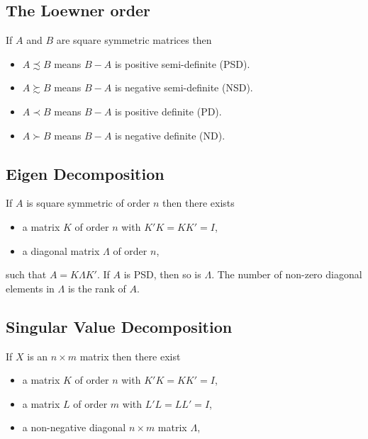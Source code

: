 \documentclass[
  12pt,
]{book}
\providecommand{\tightlist}{%
  \setlength{\itemsep}{0pt}\setlength{\parskip}{0pt}}
\theoremstyle{definition}
\theoremstyle{definition}
\theoremstyle{definition}
\theoremstyle{definition}
\theoremstyle{remark}
\begin{document}
\hypertarget{aploewner}{%
\subsection{The Loewner order}\label{aploewner}}

If \(A\) and \(B\) are square symmetric matrices then

\begin{itemize}
\tightlist
\item
  \(A\precsim B\) means \(B-A\) is positive semi-definite (PSD).
\item
  \(A\succsim B\) means \(B-A\) is negative semi-definite (NSD).
\item
  \(A\prec B\) means \(B-A\) is positive definite (PD).
\item
  \(A\succ B\) means \(B-A\) is negative definite (ND).
\end{itemize}

\hypertarget{apeigen}{%
\subsection{Eigen Decomposition}\label{apeigen}}

If \(A\) is square symmetric of order \(n\) then there exists

\begin{itemize}
\tightlist
\item
  a matrix \(K\) of order \(n\) with \(K'K=KK'=I\),
\item
  a diagonal matrix \(\Lambda\) of order \(n\),
\end{itemize}

such that \(A=K\Lambda K'\). If \(A\) is PSD, then so is \(\Lambda\). The number of non-zero diagonal elements in \(\Lambda\) is the rank of \(A\).

\hypertarget{apsvd}{%
\subsection{Singular Value Decomposition}\label{apsvd}}

If \(X\) is an \(n\times m\) matrix then there exist

\begin{itemize}
\tightlist
\item
  a matrix \(K\) of order \(n\) with \(K'K=KK'=I\),
\item
  a matrix \(L\) of order \(m\) with \(L'L=LL'=I\),
\item
  a non-negative diagonal \(n\times m\) matrix \(\Lambda\),
\end{itemize}
\end{document}
